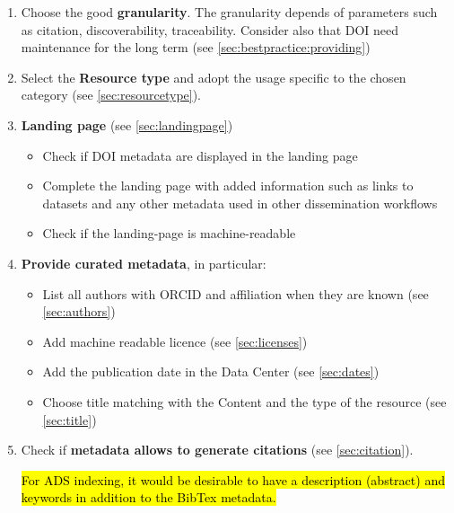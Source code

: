 \documentclass[11pt,a4paper]{ivoa}
\begin{document}
\begin{enumerate}
	\item Choose the good \textbf{granularity}. The granularity depends of parameters such as citation, discoverability, traceability. Consider also that DOI need maintenance for the long term (see \ref{sec:bestpractice:providing})
	\item Select the \textbf{Resource type} and adopt the usage specific to the chosen category (see \ref{sec:resourcetype}).
	\item \textbf{Landing page} (see \ref{sec:landingpage})
	\begin{itemize}
		\item Check if DOI metadata are displayed in the landing page 
		\item Complete the landing page with added information such as links to datasets and any other metadata used in other dissemination workflows
		\item Check if the landing-page is machine-readable
	\end{itemize}
	\item \textbf{Provide curated metadata}, in particular:
	\begin{itemize}
		\item List all authors with ORCID and affiliation when they are known (see \ref{sec:authors})
		\item Add machine readable licence (see \ref{sec:licenses})
		\item Add the publication date in the Data Center (see \ref{sec:dates})
		\item Choose title  matching with the Content and the type of the resource  (see \ref{sec:title})
	\end{itemize}
	\item Check if \textbf{metadata allows to generate citations} (see \ref{sec:citation}).	
	
	\hl{For ADS indexing, it would be desirable to have a description (abstract) and keywords in addition to the BibTex metadata.}
	

\end{enumerate}
\end{document}
